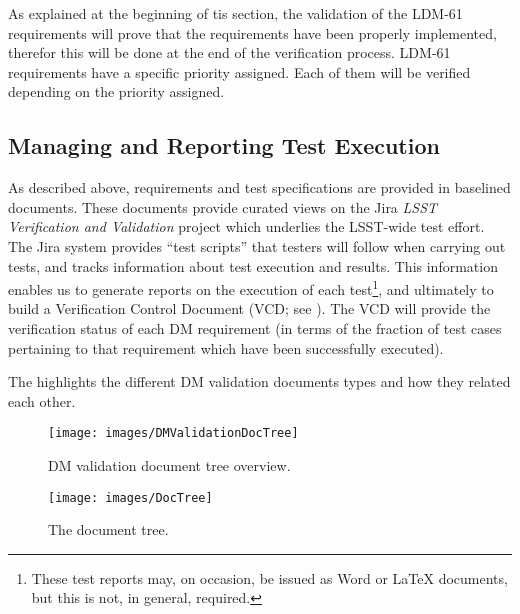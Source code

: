 As explained at the beginning of tis section, the validation of the LDM-61 requirements will prove that the \product{} requirements have been properly implemented, therefor this will be done at the end of the verification process.
LDM-61 requirements have a specific priority assigned. Each of them will be verified depending on the priority assigned.

\subsection{Managing and Reporting Test Execution}
\label{sect:reports}

As described above, requirements and test specifications are provided in baselined documents.
These documents provide curated views on the Jira \emph{LSST Verification and Validation} project which underlies the LSST-wide test effort.
The Jira system provides ``test scripts'' that testers will follow when carrying out tests, and tracks information about test execution and results.
This information enables us to generate reports on the execution of each test\footnote{These test reports may, on occasion, be issued as Word or LaTeX documents, but this is not, in general, required.}, and ultimately to build a Verification Control Document (VCD; see ).
The VCD will provide the verification status of each DM requirement (in terms of the fraction of test cases pertaining to that requirement which have been successfully executed).


The  highlights the different DM validation documents types and how they related each other.

\begin{figure}[htbp]
        \begin{center}
                \texttt{[image: images/DMValidationDocTree]}
                \caption{DM validation document tree overview.}
                \label{fig:dmvaldoctree}
        \end{center}
\end{figure}



\begin{figure}
\begin{center}
 \texttt{[image: images/DocTree]}

 \caption{The \product{} document tree.}
 \label{fig:doctree}

\end{center}
\end{figure}

